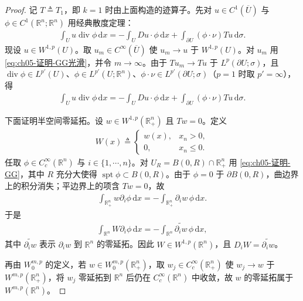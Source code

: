 \begin{proof}
记 $T\triangleq T_{1}$，即 $k=1$ 时由上面构造的迹算子。先对 $u\in C^{1}(\overline{U})$ 与 $\phi\in C^{1}(\mathbb{R}^{n};\mathbb{R}^{n})$ 用经典散度定理：
\begin{align}
\int_{U}u\operatorname{div}\phi\,\mathrm{d}x
=-\int_{U}Du\cdot\phi\,\mathrm{d}x
+\int_{\partial U}(\phi\cdot\nu)Tu\,\mathrm{d}\sigma.
\label{eq:ch05-证明-GG光滑}
\end{align}
现设 $u\in W^{1,p}(U)$。取 $u_{m}\in C^{\infty}(\overline{U})$ 使 $u_{m}\to u$ 于 $W^{1,p}(U)$。对 $u_{m}$ 用 \eqref{eq:ch05-证明-GG光滑}，并令 $m\to\infty$。由于 $Tu_{m}\to Tu$ 于 $L^{p}(\partial U;\sigma)$，且 $\operatorname{div}\phi\in L^{p'}(U)$、$\phi\in L^{p'}(U;\mathbb{R}^{n})$、$\phi\cdot\nu\in L^{p'}(\partial U;\sigma)$（$p=1$ 时取 $p'=\infty$），得
\begin{align}
\int_{U}u\operatorname{div}\phi\,\mathrm{d}x
=-\int_{U}Du\cdot\phi\,\mathrm{d}x
+\int_{\partial U}(\phi\cdot\nu)Tu\,\mathrm{d}\sigma.
\label{eq:ch05-证明-GG}
\end{align}

下面证明半空间零延拓。设 $w\in W^{1,p}(\mathbb{R}^{n}_{+})$ 且 $Tw=0$。定义
\begin{align*}
W(x)\triangleq
\begin{cases}
w(x), & x_{n}>0,\\
0, & x_{n}\leqslant0.
\end{cases}
\end{align*}
任取 $\phi\in C^{\infty}_{c}(\mathbb{R}^{n})$ 与 $i\in\{1,\cdots,n\}$。对 $U_{R}=B(0,R)\cap\mathbb{R}^{n}_{+}$ 用 \eqref{eq:ch05-证明-GG}，其中 $R$ 充分大使得 $\operatorname{spt}\phi\subset B(0,R)$。由于 $\phi=0$ 于 $\partial B(0,R)$，曲边界上的积分消失；平边界上的项含 $Tw=0$，故
\begin{align*}
\int_{\mathbb{R}^{n}_{+}}w\partial_{i}\phi\,\mathrm{d}x
=-\int_{\mathbb{R}^{n}_{+}}\partial_{i}w\,\phi\,\mathrm{d}x.
\end{align*}
于是
\begin{align}
\int_{\mathbb{R}^{n}}W\partial_{i}\phi\,\mathrm{d}x
=-\int_{\mathbb{R}^{n}}\widetilde{\partial_{i}w}\,\phi\,\mathrm{d}x,
\label{eq:ch05-证明-零延拓}
\end{align}
其中 $\widetilde{\partial_{i}w}$ 表示 $\partial_{i}w$ 到 $\mathbb{R}^{n}$ 的零延拓。因此 $W\in W^{1,p}(\mathbb{R}^{n})$，且 $D_{i}W=\widetilde{\partial_{i}w}$。

再由 $W^{m,p}_{0}$ 的定义，若 $w\in W^{m,p}_{0}(\mathbb{R}^{n}_{+})$，取 $w_{j}\in C^{\infty}_{c}(\mathbb{R}^{n}_{+})$ 使 $w_{j}\to w$ 于 $W^{m,p}(\mathbb{R}^{n}_{+})$，将 $w_{j}$ 零延拓到 $\mathbb{R}^{n}$ 后仍在 $C^{\infty}_{c}(\mathbb{R}^{n})$ 中收敛，故 $w$ 的零延拓属于 $W^{m,p}(\mathbb{R}^{n})$。


\end{proof}
